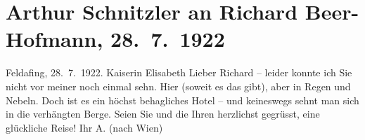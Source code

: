 

         
         \renewcommand{\erwaehntePersonen}{Personen: Richard Beer-Hofmann}
         \renewcommand{\erwaehnteOrte}{Orte: Feldafing, Hotel Kaiserin Elisabeth, Wien}
         \renewcommand{\erwaehnteWerke}{}
               \section[Arthur Schnitzler an Richard Beer-Hofmann, 28. 7. 1922]{ Arthur Schnitzler an Richard Beer-Hofmann, 28. 7. 1922}\nopagebreak{}\rehead{ }\begin{ledgroupsized}[t]{13cm}\normalsize\beginnumbering{} \toendnotes[C]{\smallbreak\pagebreak[2]} 
\toendnotes[C]{\smallbreak}\pstart
           \raggedleft{}{\pb}Feldafing,
                  28. 7. 1922.\pend
           \pstart
           \raggedleft{}Kaiserin Elisabeth\pend
           \pstart
           Lieber Richard – leider konnte ich Sie nicht vor meiner \label{K_L02554-1v}\label{K_L02554-1h} noch einmal sehn. Hier \label{K_L02554-2v}\label{K_L02554-2h} (soweit es das gibt), aber in Regen und Nebeln. Doch ist es ein höchst
               behagliches Hotel – und
               keineswegs sehnt man sich in die verhängten Berge. Seien Sie und die Ihren herzlichst
               gegrüsst, eine glückliche Reise! Ihr \spacefill\mbox{A.}\pend
           \pstart
           \noindent{}(nach Wien)\pend
           
         
         \endnumbering{}\end{ledgroupsized}  \newcommand{\dateiname}{L02554}\newcommand{\titel}{Arthur Schnitzler an Richard Beer-Hofmann, 28. 7. 1922}\newcommand{\editorInnen}{Martin Anton Müller und Gerd-Hermann Susen}
      